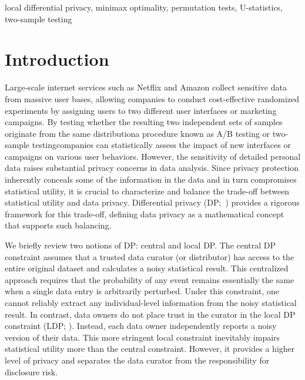 \documentclass[twoside,11pt]{article}
\begin{document}
\begin{keywords}
 local differential privacy, minimax optimality, permutation tests, U-statistics, two-sample testing
\end{keywords}




\setcounter{tocdepth}{2}

\section{Introduction}\label{section_intro}
Large-scale internet services such as Netflix and Amazon collect sensitive data from massive user bases, allowing companies to conduct cost-effective randomized experiments by assigning users to two different user interfaces or marketing campaigns. By testing whether the resulting two independent sets of samples originate from the same distribution{\textemdash}a procedure known as A/B testing or two-sample testing{\textemdash}companies can statistically assess the impact of new interfaces or campaigns on various user behaviors. However, the sensitivity of detailed personal data raises substantial privacy concerns in data analysis. Since privacy protection inherently conceals some of the information in the data and in turn compromises statistical utility, it is crucial to characterize and balance the trade-off between statistical utility and data privacy. Differential privacy (DP;~\citet{CynthiaDwork2006CalibratingAnalysis}) provides a rigorous framework for this trade-off, defining data privacy as a mathematical concept that supports such balancing.

We briefly review two notions of DP: central and local DP.
The central DP constraint assumes that a trusted data curator (or distributor) has access to the entire original dataset and calculates a noisy statistical result. This centralized approach requires that the probability of any event remains essentially the same when a single data entry is arbitrarily perturbed.
Under this constraint, one cannot reliably extract any individual-level information from the noisy statistical result. In contrast, data owners do not place trust in the curator in the local DP constraint (LDP; \citet{Kasiviswanathan2008WhatPrivately}). Instead, each data owner independently reports a noisy version of their data. This more stringent local constraint inevitably impairs statistical utility more than the central constraint. However, it provides a higher level of privacy and separates the data curator from the responsibility for disclosure risk.
\end{document}
